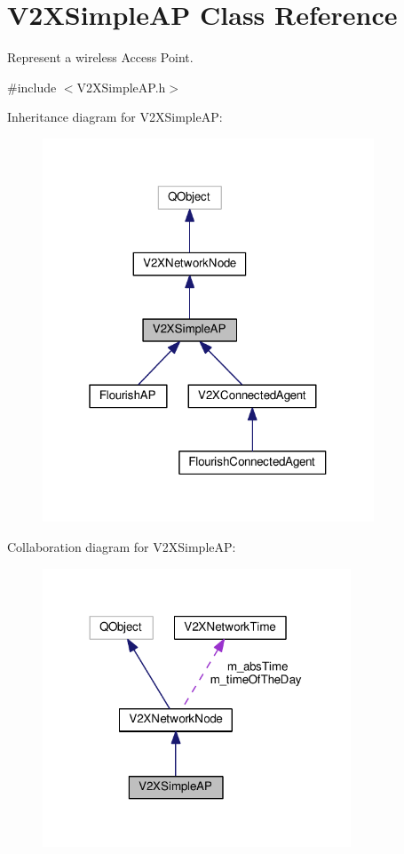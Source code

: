 \hypertarget{classV2XSimpleAP}{}\section{V2\+X\+Simple\+AP Class Reference}
\label{classV2XSimpleAP}


Represent a wireless Access Point.  




{\ttfamily \#include $<$V2\+X\+Simple\+A\+P.\+h$>$}



Inheritance diagram for V2\+X\+Simple\+AP\+:\nopagebreak
\begin{figure}[H]
\begin{center}
\leavevmode
\includegraphics[width=280pt]{classV2XSimpleAP__inherit__graph}
\end{center}
\end{figure}


Collaboration diagram for V2\+X\+Simple\+AP\+:\nopagebreak
\begin{figure}[H]
\begin{center}
\leavevmode
\includegraphics[width=260pt]{classV2XSimpleAP__coll__graph}
\end{center}
\end{figure}
